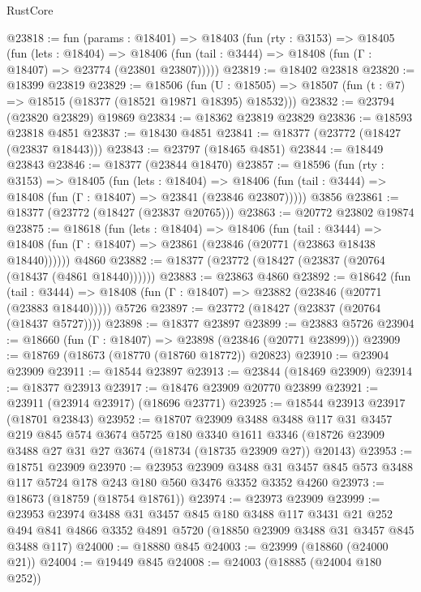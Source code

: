 \begin{lexlean}{RustCore}
\begin{coremodule}
@23818 := fun (params : @18401) =>
  @18403
    (fun (rty : @3153) =>
    @18405
      (fun (lets : @18404) =>
      @18406 (fun (tail : @3444) => @18408 (fun (Γ : @18407) => @23774 (@23801 @23807)))))
@23819 := @18402 @23818
@23820 := @18399 @23819
@23829 := @18506
    (fun (U : @18505) => @18507 (fun (t : @7) => @18515 (@18377 (@18521 @19871 @18395) @18532)))
@23832 := @23794 (@23820 @23829) @19869
@23834 := @18362 @23819 @23829
@23836 := @18593 @23818 @4851
@23837 := @18430 @4851
@23841 := @18377 (@23772 (@18427 (@23837 @18443)))
@23843 := @23797 (@18465 @4851)
@23844 := @18449 @23843
@23846 := @18377 (@23844 @18470)
@23857 := @18596
    (fun (rty : @3153) =>
    @18405
      (fun (lets : @18404) =>
      @18406 (fun (tail : @3444) => @18408 (fun (Γ : @18407) => @23841 (@23846 @23807)))))
    @3856
@23861 := @18377 (@23772 (@18427 (@23837 @20765)))
@23863 := @20772 @23802 @19874
@23875 := @18618
    (fun (lets : @18404) =>
    @18406
      (fun (tail : @3444) =>
      @18408 (fun (Γ : @18407) => @23861 (@23846 (@20771 (@23863 @18438 @18440))))))
    @4860
@23882 := @18377 (@23772 (@18427 (@23837 (@20764 (@18437 (@4861 @18440))))))
@23883 := @23863 @4860
@23892 := @18642
    (fun (tail : @3444) => @18408 (fun (Γ : @18407) => @23882 (@23846 (@20771 (@23883 @18440)))))
    @5726
@23897 := @23772 (@18427 (@23837 (@20764 (@18437 @5727))))
@23898 := @18377 @23897
@23899 := @23883 @5726
@23904 := @18660 (fun (Γ : @18407) => @23898 (@23846 (@20771 @23899)))
@23909 := @18769 (@18673 (@18770 (@18760 @18772)) @20823)
@23910 := @23904 @23909
@23911 := @18544 @23897
@23913 := @23844 (@18469 @23909)
@23914 := @18377 @23913
@23917 := @18476 @23909 @20770 @23899
@23921 := @23911 (@23914 @23917) (@18696 @23771)
@23925 := @18544 @23913 @23917 (@18701 @23843)
@23952 := @18707
    @23909
    @3488
    @3488
    @117
    @31
    @3457
    @219
    @845
    @574
    @3674
    @5725
    @180
    @3340
    @1611
    @3346
    (@18726 @23909 @3488 @27 @31 @27 @3674 (@18734 (@18735 @23909 @27)) @20143)
@23953 := @18751 @23909
@23970 := @23953
    @23909
    @3488
    @31
    @3457
    @845
    @573
    @3488
    @117
    @5724
    @178
    @243
    @180
    @560
    @3476
    @3352
    @3352
    @4260
@23973 := @18673 (@18759 (@18754 @18761))
@23974 := @23973 @23909
@23999 := @23953
    @23974
    @3488
    @31
    @3457
    @845
    @180
    @3488
    @117
    @3431
    @21
    @252
    @494
    @841
    @4866
    @3352
    @4891
    @5720
    (@18850 @23909 @3488 @31 @3457 @845 @3488 @117)
@24000 := @18880 @845
@24003 := @23999 (@18860 (@24000 @21))
@24004 := @19449 @845
@24008 := @24003 (@18885 (@24004 @180 @252))

\end{coremodule}
\end{lexlean}
